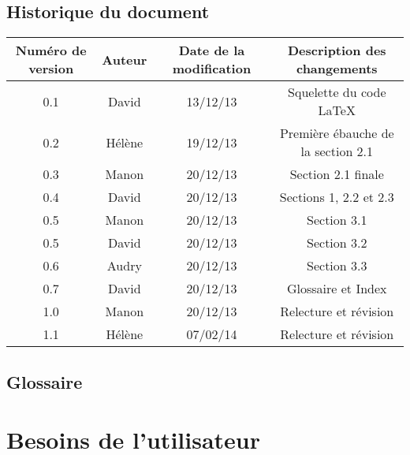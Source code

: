 \documentclass[a4paper,titlepage]{scrreprt}
\begin{document}
\section{Historique du document}
  \begin{tabular}{|c|c|c|c|}
    \hline
    Numéro de version & Auteur & Date de la modification & Description des changements \\
    \hline
    0.1 & David & 13/12/13 & Squelette du code \LaTeX \\
    0.2 & Hélène & 19/12/13 & Première ébauche de la section 2.1 \\
    0.3 & Manon & 20/12/13 & Section 2.1 finale \\
    0.4 & David & 20/12/13 & Sections 1,  2.2 et 2.3 \\
    0.5 & Manon & 20/12/13 & Section 3.1 \\
    0.5 & David & 20/12/13 & Section 3.2 \\
    0.6 & Audry & 20/12/13 & Section 3.3 \\
    0.7 & David & 20/12/13 & Glossaire et Index \\
    1.0 & Manon & 20/12/13 & Relecture et révision \\
    1.1 & Hélène & 07/02/14 & Relecture et révision \\
    \hline
  \end{tabular}


\section{Glossaire}
  \removepagebreak
  \printglossaries
  \restorepagebreak
\chapter{Besoins de l'utilisateur}
  
\end{document}
